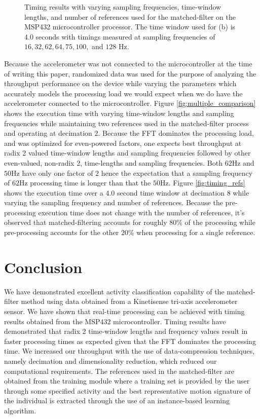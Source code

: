 \documentclass[journal]{IEEEtran}
\begin{document}
\begin{figure}[!ht]
   \centering
   \quad
   \caption{Timing results with varying sampling frequencies, time-window lengths, and number of references used for the matched-filter on the MSP432 microcontroller processor. The time window used for (b) is 4.0 seconds with timings measured at sampling frequencies of $16, 32, 62, 64, 75, 100,$ and $128$ Hz.}
   \label{fig:timing}
\end{figure}
%
Because the accelerometer was not connected to the microcontroller at the time of writing this paper, randomized data was used for the purpose of analyzing the throughput performance on the device while varying the parameters which accurately models the processing load we would expect when we do have the accelerometer connected to the microcontroller.
Figure \ref{fig:multiple_comparison} shows the execution time with varying time-window lengths and sampling frequencies while maintaining two references used in the matched-filter process and operating at decimation $2$.
Because the FFT dominates the processing load, and was optimized for even-powered factors, one expects best throughput at radix 2 valued time-window lengths and sampling frequencies followed by other even-valued, non-radix 2, time-lengths and sampling frequencies. Both $62$Hz and $50$Hz have only one factor of $2$ hence the expectation that a sampling frequency of $62$Hz processing time is longer than that the $50$Hz.
Figure \ref{fig:timing_refs} shows the execution time over a $4.0$ second time window at decimation $8$ while varying the sampling frequency and number of references. Because the pre-processing execution time does not change with the number of references, it's observed that matched-filtering accounts for roughly $80$\% of the processing while pre-processing accounts for the other $20$\% when processing for a single reference.
%
\section{Conclusion}
We have demonstrated excellent activity classification capability of the matched-filter method using data obtained from a Kinetisense tri-axis accelerometer sensor.
We have shown that real-time processing can be achieved with timing results obtained from the MSP432 microcontroller.
Timing results have demonstrated that radix 2 time-window lengths and frequency values result in faster processing times as expected given that the FFT dominates the processing time.
We increased our throughput with the use of data-compression techniques, namely decimation and dimensionality reduction, which reduced our computational requirements.
The references used in the matched-filter are obtained from the training module where a training set is provided by the user through some specified activity and the best representative motion signature of the individual is extracted through the use of an instance-based learning algorithm.

%
\appendices
%
\ifCLASSOPTIONcaptionsoff
  \newpage
\fi
%


\end{document}
